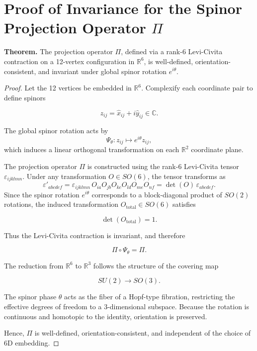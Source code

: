 \documentclass{article}
\begin{document}
\section*{Proof of Invariance for the Spinor Projection Operator $\Pi$}

\textbf{Theorem.} 
The projection operator $\Pi$, defined via a rank-6 Levi-Civita contraction on a 12-vertex configuration in $\mathbb{R}^6$, is well-defined, orientation-consistent, and invariant under global spinor rotation $e^{i\theta}$.

\begin{proof}
Let the 12 vertices be embedded in $\mathbb{R}^6$.  
Complexify each coordinate pair to define spinors


\[
z_{ij} = \hat{x}_{ij} + i\hat{y}_{ij} \in \mathbb{C}.
\]


The global spinor rotation acts by
\begin{equation}
    \Psi_\theta : z_{ij} \mapsto e^{i\theta} z_{ij},
\end{equation}
which induces a linear orthogonal transformation on each $\mathbb{R}^2$ coordinate plane.

The projection operator $\Pi$ is constructed using the rank-6 Levi-Civita tensor $\varepsilon_{ijklmn}$.  
Under any transformation $O \in SO(6)$, the tensor transforms as
\begin{equation}
    \varepsilon'_{abcdef}
    = \varepsilon_{ijklmn}\,
      O_{ia} O_{jb} O_{kc} O_{ld} O_{me} O_{nf}
    = \det(O)\, \varepsilon_{abcdef}.
\end{equation}
Since the spinor rotation $e^{i\theta}$ corresponds to a block-diagonal product of $SO(2)$ rotations, the induced transformation $O_{\text{total}} \in SO(6)$ satisfies


\[
\det(O_{\text{total}}) = 1.
\]


Thus the Levi-Civita contraction is invariant, and therefore


\[
\Pi \circ \Psi_\theta = \Pi.
\]



The reduction from $\mathbb{R}^6$ to $\mathbb{R}^3$ follows the structure of the covering map


\[
SU(2) \longrightarrow SO(3).
\]


The spinor phase $\theta$ acts as the fiber of a Hopf-type fibration, restricting the effective degrees of freedom to a 3-dimensional subspace.  
Because the rotation is continuous and homotopic to the identity, orientation is preserved.

Hence, $\Pi$ is well-defined, orientation-consistent, and independent of the choice of 6D embedding.
\end{proof}
\end{document}
